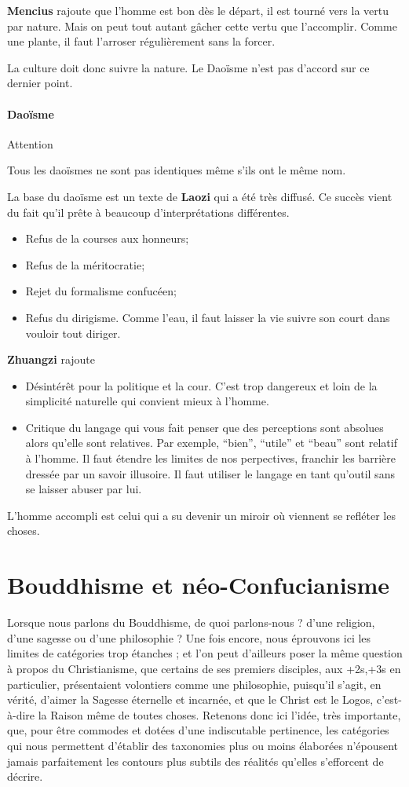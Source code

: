 \textbf{Mencius} rajoute que l'homme est bon dès le départ,
il est tourné vers la vertu par nature.
Mais on peut tout autant gâcher cette vertu que l'accomplir.
Comme une plante, il faut l'arroser régulièrement sans la forcer.

La culture doit donc suivre la nature.
Le Daoïsme n'est pas d'accord sur ce dernier point.

\subsection{Daoïsme}
\subparagraph{Attention}
Tous les daoïsmes ne sont pas identiques même s'ils ont le même nom.

La base du daoïsme est un texte de \textbf{Laozi} qui a été très diffusé.
Ce succès vient du fait qu'il prête à beaucoup d'interprétations différentes.
\begin{itemize}
	\item Refus de la courses aux honneurs;
	\item Refus de la méritocratie;
	\item Rejet du formalisme confucéen;
	\item Refus du dirigisme.
		Comme l'eau, il faut laisser la vie suivre son court dans vouloir tout diriger.
\end{itemize}

\textbf{Zhuangzi} rajoute
\begin{itemize}
	\item Désintérêt pour la politique et la cour.
		C'est trop dangereux et loin de la simplicité naturelle qui convient mieux à l'homme.
	\item Critique du langage qui vous fait penser que des perceptions sont absolues alors qu'elle sont relatives.
		Par exemple, ``bien'', ``utile'' et ``beau'' sont relatif à l'homme.
		Il faut étendre les limites de nos perpectives, franchir les barrière dressée par un savoir illusoire.
		Il faut utiliser le langage en tant qu'outil sans se laisser abuser par lui.
\end{itemize}
L'homme accompli est celui qui a su devenir un miroir où viennent se refléter les choses.

\part{Bouddhisme et néo-Confucianisme}

Lorsque nous parlons du Bouddhisme, de quoi parlons-nous ? d'une religion, d'une sagesse ou d'une philosophie ? Une fois encore, nous éprouvons ici les limites de
catégories trop étanches ; et l'on peut d'ailleurs poser la même question à propos du
Christianisme, que certains de ses premiers disciples, aux +2s,+3s en particulier, présentaient volontiers comme une philosophie, puisqu'il s'agit, en vérité, d'aimer
la Sagesse éternelle et incarnée, et que le Christ est le Logos, c'est-à-dire la Raison
même de toutes choses.
Retenons donc ici l'idée, très importante, que, pour être commodes et dotées d'une indiscutable pertinence, les catégories qui nous permettent
d'établir des taxonomies plus ou moins élaborées n'épousent jamais parfaitement les
contours plus subtils des réalités qu'elles s'efforcent de décrire.

